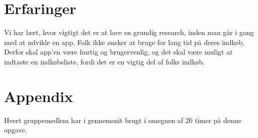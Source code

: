 \documentclass[12pt]{article}
\begin{document}
\noindent {}

\newpage

\section{Erfaringer}

Vi har lært, hvor vigtigt det er at lave en grundig research, inden man går i gang med at udvikle en app. Folk ikke ønsker at bruge for lang tid på deres indkøb. Derfor skal app'en være hurtig og brugervenlig, og det skal være muligt at indtaste en indkøbsliste, fordi det er en vigtig del af folks indkøb.

\section{Appendix}

Hvert gruppemedlem har i gennemsnit brugt i omegnen af 20 timer på denne opgave.
\end{document}
